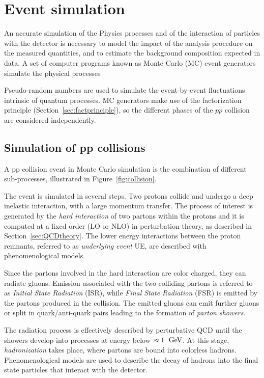\chapter{Event simulation}
\label{sec:simulation}

An accurate simulation of the Physics processes and of the interaction
of particles with the detector is necessary to model the impact of the
analysis procedure on the measured quantities, and to estimate the
background composition expected in data. A set of computer programs
known as Monte Carlo (MC) event generators simulate the physical
processes 

Pseudo-random numbers are used to simulate the event-by-event
fluctuations intrinsic of quantum processes. MC generators make use of
the factorization principle (Section~\ref{sec:factprinciple}), so the
different phases of the $pp$ collision are considered independently.

\section{Simulation of pp collisions}
\label{sec:MCsimulation}

A pp collision event in Monte Carlo simulation
is the combination of different sub-processes,
illustrated in Figure~\ref{fig:collision}.

The event is simulated in several steps. Two protons collide and
undergo a deep inelastic interaction, with a large momentum transfer.
The process of interest is generated by the {\it hard interaction} of
two partons within the protons and it is computed at a fixed order (LO
or NLO) in perturbation theory, as described in Section~\ref{sec:QCDtheory}. 
The lower energy interactions between the proton remnants,
referred to as {\it underlying event} UE, are described with
phenomenological models.

Since the partons involved in the hard interaction are color charged,
they can radiate gluons. Emission associated with the two colliding partons  
is referred to as {\it Initial State Radiation} (ISR), while {\it
  Final State Radiation} (FSR) is emitted by the partons produced in
the collision. The emitted gluons can emit further gluons or split in
quark/anti-quark pairs leading to the formation of {\it parton
  showers}.

The radiation process is effectively described by perturbative QCD until
the showers develop into processes at energy below
$\approx{}1~\; \mathrm{GeV}{}$. 
At this stage, {\it hadronization} takes place, where partons are
bound into colorless hadrons. Phenomenological models are used to
describe the decay of hadrons into the final state particles that
interact with the detector.

